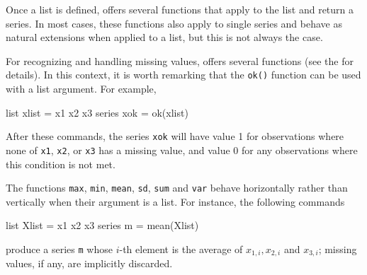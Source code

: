 Once a list is defined,  offers several functions that
apply to the list and return a series. In most cases, these functions
also apply to single series and behave as natural extensions when
applied to a list, but this is not always the case.

For recognizing and handling missing values,  offers
several functions (see the \GCR{} for details). In this context, it is
worth remarking that the \texttt{ok()} function can be used with a
list argument.  For example,
%
\begin{code}
list xlist = x1 x2 x3
series xok = ok(xlist)
\end{code}
%
After these commands, the series \texttt{xok} will have value 1 for
observations where none of \texttt{x1}, \texttt{x2}, or
\texttt{x3} has a missing value, and value 0 for any observations
where this condition is not met.

The functions \texttt{max}, \texttt{min}, \texttt{mean}, \texttt{sd},
\texttt{sum} and \texttt{var} behave horizontally rather than
vertically when their argument is a list. For instance, the following
commands
\begin{code}
  list Xlist = x1 x2 x3
  series m = mean(Xlist)
\end{code}
produce a series \texttt{m} whose $i$-th element is the average of
$x_{1,i}, x_{2,i}$ and $x_{3,i}$; missing values, if any, are implicitly discarded.

